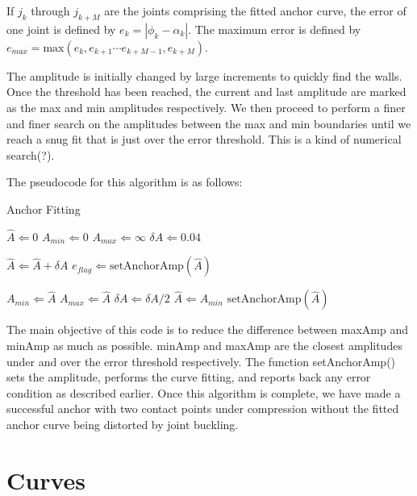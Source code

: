 If $j_k$ through $j_{k+M}$ are the joints comprising the fitted anchor curve, the error of one joint is defined by $e_k = |\phi_k-\alpha_k|$.  The maximum error is defined by $e_{max} = \mathrm{max}(e_k, e_{k+1} \cdots e_{k+M-1}, e_{k+M})$.

The amplitude is initially changed by large increments to quickly find the walls.  Once the threshold has been reached, the current and last amplitude are marked as the max and min amplitudes respectively.  We then proceed to perform a finer and finer search on the amplitudes between the max and min boundaries until we reach a snug fit that is just over the error threshold.  This is a kind of numerical search(?).

The pseudocode for this algorithm is as follows:


\begin{algorithm}
\caption{Anchor Fitting}          %
\label{alg:anchor}
\begin{algorithmic}

\State $\hat{A} \Leftarrow 0$
\State $A_{min} \Leftarrow 0$
\State $A_{max} \Leftarrow \infty$
\State $\delta A \Leftarrow 0.04$


  \State $\hat{A} \Leftarrow \hat{A} + \delta A$
  \State $e_{flag} \Leftarrow \mathrm{setAnchorAmp}(\hat{A})$
 
    \State $A_{min} \Leftarrow \hat{A}$
  \Else
    \State $A_{max} \Leftarrow \hat{A}$
    \State $\delta A \Leftarrow \delta A / 2$
    \State $\hat{A} \Leftarrow A_{min}$
    \State $\mathrm{setAnchorAmp}(\hat{A})$

  \EndIf

\EndWhile

\end{algorithmic}
\end{algorithm}

The main objective of this code is to reduce the difference between maxAmp and minAmp as much as possible.  minAmp and maxAmp are the closest amplitudes under and over the error threshold respectively.  The function setAnchorAmp() sets the amplitude, performs the curve fitting, and reports back any error condition as described earlier.  Once this algorithm is complete, we have made a successful anchor with two contact points under compression without the fitted anchor curve being distorted by joint buckling.

\section{Curves}

